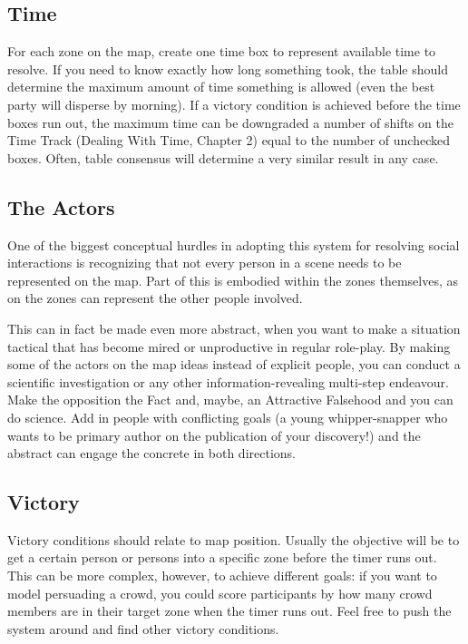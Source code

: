 \subsection{Time}\label{sec:Time}

For each zone on the map, create one time box to represent available time to resolve. If you need to know exactly how long something took, the table should determine the maximum amount of time something is allowed (even the best party will disperse by morning). If a victory condition is achieved before the time boxes run out, the maximum time can be downgraded a number of shifts on the Time Track (Dealing With Time, Chapter 2) equal to the number of unchecked boxes. Often, table consensus will determine a very similar result in any case.


\subsection{The Actors}\label{sec:The Actors}

One of the biggest conceptual hurdles in adopting this system for resolving social interactions is recognizing that not every person in a scene needs to be represented on the map. Part of this is embodied within the zones themselves, as \Aspects{} on the zones can represent the other people involved.

This can in fact be made even more abstract, when you want to make a situation tactical that has become mired or unproductive in regular role-play. By making some of the actors on the map ideas instead of explicit people, you can conduct a scientific investigation or any other information-revealing multi-step endeavour. Make the opposition the Fact and, maybe, an Attractive Falsehood and you can do science. Add in people with conflicting goals (a young whipper-snapper who wants to be primary author on the publication of your discovery!) and the abstract can engage the concrete in both directions.


\subsection{Victory}\label{sec:Victory}

Victory conditions should relate to map position. Usually the objective will be to get a certain person or persons into a specific zone before the timer runs out. This can be more complex, however, to achieve different goals: if you want to model persuading a crowd, you could score participants by how many crowd members are in their target zone when the timer runs out. Feel free to push the system around and find other victory conditions.

